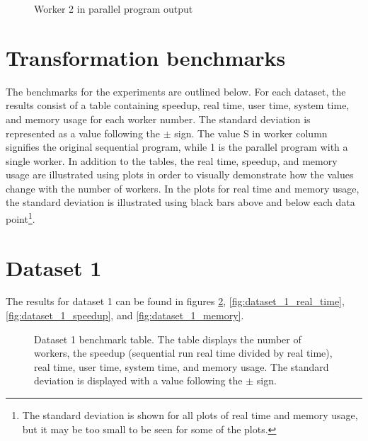 \begin{figure}[ht]
  
  \caption{Worker 2 in parallel program  output}
  \label{fig:parallel_profiler_w2}
\end{figure}
\clearpage

\section{Transformation benchmarks}
The benchmarks for the experiments are outlined below. For each dataset, the results consist of a table containing
speedup, real time, user time, system time, and memory usage for each worker number. The standard deviation is represented
as a value following the $\pm$ sign. The value S in worker column signifies the original sequential program, while 1 is the
parallel program with a single worker. In addition to the tables, the real time, speedup, and memory usage are illustrated
using plots in order to visually demonstrate how the values change with the number of workers. In the plots for real time
and memory usage, the standard deviation is illustrated using black bars above and below each data point\footnote{
The standard deviation is shown for all plots of real time and memory usage, but it may be too small to be seen for some of the plots.}.

\section{Dataset 1}
The results for dataset 1 can be found in figures \ref{fig:dataset_1_table}, \ref{fig:dataset_1_real_time}, \ref{fig:dataset_1_speedup}, and \ref{fig:dataset_1_memory}.

\begin{figure}[ht]
\centering
{}
\caption[Dataset 1 benchmark table.]{Dataset 1 benchmark table. The table displays the number of workers, the speedup (sequential run real time divided by real time), real time,
user time, system time, and memory usage. The standard deviation is displayed with a value following the $\pm$ sign.}
\label{fig:dataset_1_table}
\end{figure}


